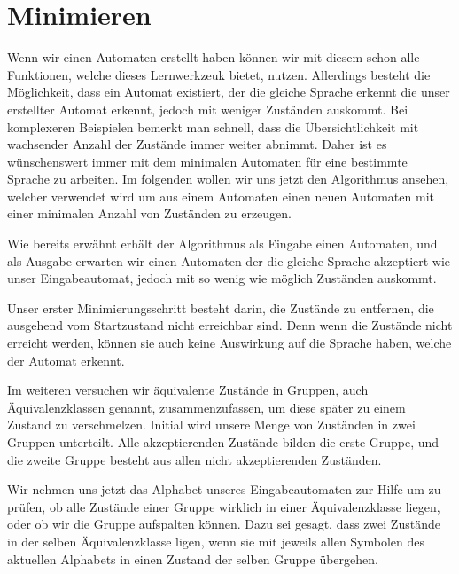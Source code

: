 

\chapter{Minimieren}\label{Minimize}

Wenn wir einen Automaten erstellt haben können wir mit diesem schon alle
Funktionen, welche dieses Lernwerkzeuk bietet, nutzen. Allerdings besteht die
Möglichkeit, dass ein Automat existiert, der die gleiche Sprache erkennt die
unser erstellter Automat erkennt, jedoch mit weniger Zuständen auskommt. Bei
komplexeren Beispielen bemerkt man schnell, dass die Übersichtlichkeit mit
wachsender Anzahl der Zustände immer weiter abnimmt. Daher ist es wünschenswert
immer mit dem minimalen Automaten für eine bestimmte Sprache zu arbeiten. Im
folgenden wollen wir uns jetzt den Algorithmus ansehen, welcher verwendet wird
um aus einem Automaten einen neuen Automaten mit einer minimalen Anzahl von
Zuständen zu erzeugen.\vspace{10pt}

Wie bereits erwähnt erhält der Algorithmus als Eingabe einen Automaten, und als
Ausgabe erwarten wir einen Automaten der die gleiche Sprache akzeptiert wie
unser Eingabeautomat, jedoch mit so wenig wie möglich Zuständen
auskommt.\vspace{10pt}

Unser erster Minimierungsschritt besteht darin, die Zustände zu entfernen, die
ausgehend vom Startzustand nicht erreichbar sind. Denn wenn die Zustände nicht
erreicht werden, können sie auch keine Auswirkung auf die Sprache haben, welche
der Automat erkennt.\vspace{10pt}

Im weiteren versuchen wir äquivalente Zustände in Gruppen, auch
Äquivalenz\-klassen genannt, zusammenzufassen, um diese später zu einem Zustand
zu verschmelzen. Initial wird unsere Menge von Zuständen in zwei Gruppen
unterteilt. Alle akzeptierenden Zustände bilden die erste Gruppe, und die
zweite Gruppe besteht aus allen nicht akzeptierenden Zuständen.\vspace{10pt}

Wir nehmen uns jetzt das Alphabet unseres Eingabeautomaten zur Hilfe um zu
prüfen, ob alle Zustände einer Gruppe wirklich in einer Äquivalenzklasse
liegen, oder ob wir die Gruppe aufspalten können. Dazu sei gesagt, dass zwei
Zustände in der selben Äquivalenzklasse ligen, wenn sie mit jeweils allen
Symbolen des aktuellen Alphabets in einen Zustand der selben Gruppe
übergehen.\vspace{10pt}


